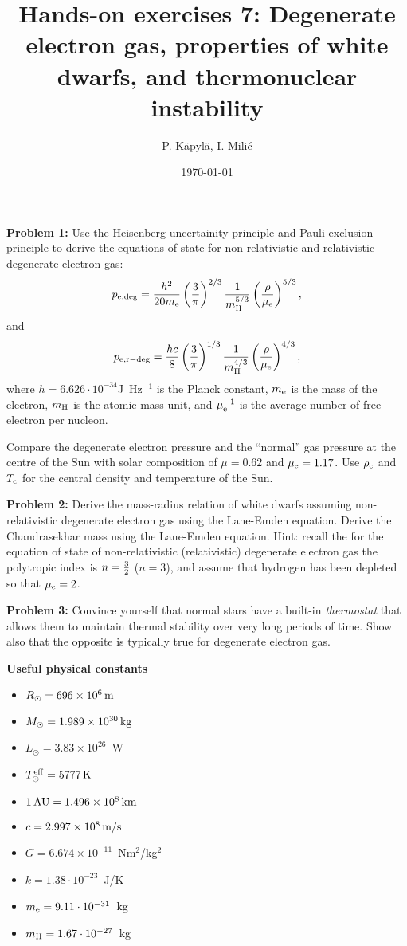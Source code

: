 \documentclass[12pt]{article}
\title{Hands-on exercises 7: Degenerate electron gas, properties of white dwarfs, and thermonuclear instability}
\author{P. K\"{a}pyl\"{a}, I. Mili\'{c}}
\date{\today}
\begin{document}
\maketitle

{\bf Problem 1:} Use the Heisenberg uncertainity principle and Pauli
exclusion principle to derive the equations of state for
non-relativistic and relativistic degenerate electron gas:
\begin{equation}
p_{\rm e,deg} = \frac{h^2}{20 m_{\rm e}} \left(\frac{3}{\pi} \right)^{2/3} \frac{1}{m_{\rm H}^{5/3}} \left( \frac{\rho}{\mu_{\rm e}} \right)^{5/3},
\end{equation}
and 
\begin{equation}
p_{\rm e,r-deg} = \frac{hc}{8} \left(\frac{3}{\pi} \right)^{1/3} \frac{1}{m_{\rm H}^{4/3}} \left( \frac{\rho}{\mu_{\rm e}} \right)^{4/3},
\end{equation}
where $h = 6.626\cdot 10^{-34}$J~Hz$^{-1}$ is the Planck constant,
$m_{\rm e}$ is the mass of the electron, $m_{\rm H}$ is the atomic
mass unit, and $\mu_{\rm e}^{-1}$ is the average number of free
electron per nucleon.

Compare the degenerate electron pressure and the ``normal'' gas
pressure at the centre of the Sun with solar composition of $\mu=0.62$
and $\mu_{\rm e} = 1.17$. Use $\rho_{\rm c}$ and $T_{\rm c}$ for the
central density and temperature of the Sun.

{\bf Problem 2:} Derive the mass-radius relation of white dwarfs
assuming non-relativistic degenerate electron gas using the Lane-Emden
equation. Derive the Chandrasekhar mass using the Lane-Emden
equation. Hint: recall the for the equation of state of
non-relativistic (relativistic) degenerate electron gas the polytropic
index is $n={3 \over 2}$ ($n=3$), and assume that hydrogen has been
depleted so that $\mu_{\rm e} = 2$.

{\bf Problem 3:} Convince yourself that normal stars have a built-in
\emph{thermostat} that allows them to maintain thermal stability over
very long periods of time. Show also that the opposite is typically
true for degenerate electron gas.


{\bf Useful physical constants}
\begin{itemize}
  \item $R_{\odot} = 696 \times 10^6\,{\rm m}$
  \item $M_{\odot} = 1.989 \times 10^{30}\,{\rm kg}$
  \item $L_{\odot} = 3.83 \times 10^{26}$~W
  \item $T^{\rm eff}_{\odot} = 5777\,{\rm K}$
  \item $1\,{\rm AU} = 1.496 \times 10^8\,{\rm km}$
  \item $c = 2.997 \times 10^8\,{\rm m/s}$
  \item $G = 6.674 \times 10^{-11}$~Nm$^2$/kg$^2$
  \item $k = 1.38\cdot10^{-23}$~J/K
  \item $m_{\rm e} = 9.11\cdot10^{-31}$~kg
  \item $m_{\rm H} = 1.67\cdot10^{-27}$~kg
\end{itemize}
\end{document}
